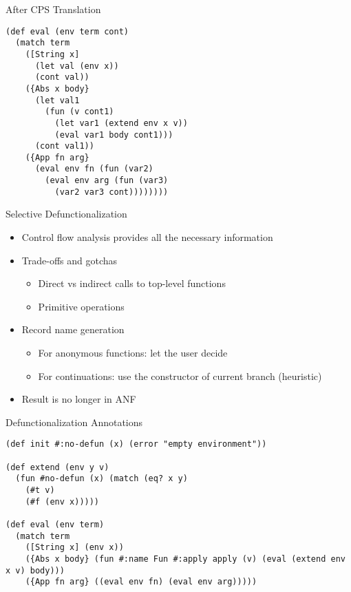 \documentclass{beamer}
\begin{document}
\begin{frame}[fragile]{After CPS Translation}
  \begin{lstlisting}
(def eval (env term cont)
  (match term
    ([String x]
      (let val (env x))
      (cont val))
    ({Abs x body}
      (let val1
        (fun (v cont1)
          (let var1 (extend env x v))
          (eval var1 body cont1)))
      (cont val1))
    ({App fn arg}
      (eval env fn (fun (var2)
        (eval env arg (fun (var3)
          (var2 var3 cont))))))))
  \end{lstlisting}
\end{frame}

\begin{frame}[fragile]{Selective Defunctionalization}
  \begin{itemize}
    \item Control flow analysis provides all the necessary information\pause
    \item Trade-offs and gotchas
    \begin{itemize}
      \item Direct vs indirect calls to top-level functions\pause
      \item Primitive operations\pause
    \end{itemize}
    \item Record name generation
    \begin{itemize}
      \item For anonymous functions: let the user decide\pause
      \item For continuations: use the constructor of current branch (heuristic)\pause
    \end{itemize}
    \item Result is no longer in ANF
  \end{itemize}
\end{frame}

\begin{frame}[fragile]{Defunctionalization Annotations}
  \begin{lstlisting}
(def init #:no-defun (x) (error "empty environment"))

(def extend (env y v)
  (fun #no-defun (x) (match (eq? x y)
    (#t v)
    (#f (env x)))))

(def eval (env term)
  (match term
    ([String x] (env x))
    ({Abs x body} (fun #:name Fun #:apply apply (v) (eval (extend env x v) body)))
    ({App fn arg} ((eval env fn) (eval env arg)))))
  \end{lstlisting}
\end{frame}
\end{document}

